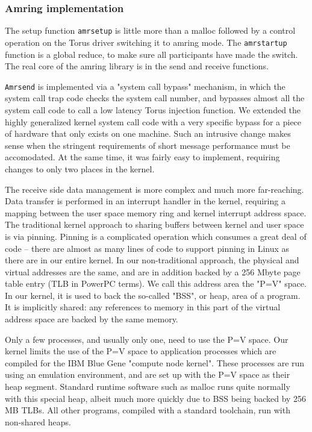\documentclass[letterpaper,twocolumn,10pt]{article}
\begin{document}
\subsubsection{Amring implementation}
The setup function {\tt amrsetup} is little more than a malloc followed by a 
control operation on the Torus driver switching it to amring mode. The {\tt amrstartup} 
function is a global reduce, to make sure all participants have made the switch. The real 
core of the amring library is in the send and receive functions. 

{\tt Amrsend} is implemented via a "system call bypass" mechanism, in which the system call trap code
checks the system call number, and bypasses almost all the system call code to call a low latency 
Torus injection function. We
extended the highly generalized kernel system call code with a very specific bypass for a piece of hardware that only exists on 
one machine. Such an intrusive change makes sense when the stringent requirements of short message 
performance must be accomodated. At the same time, it was fairly easy to implement, requiring changes to only two places in the kernel. 

The receive side data management is more complex and much more far-reaching. Data transfer is performed in an interrupt 
handler in the kernel, requiring a mapping between the user space memory ring and kernel interrupt address space. 
The traditional kernel approach to sharing buffers between kernel and user space is via pinning. Pinning is a complicated 
operation which consumes a great deal of code -- there are almost as many lines of code to support 
pinning in Linux as there are in our entire kernel. 
In our  non-traditional approach, the physical and virtual addresses are the same, and are in addition backed by a 
256 Mbyte page table entry (TLB in PowerPC terms). 
We call this address area the "P=V" space. In our kernel, it is used to back the so-called "BSS", or heap, area of a program. It is implicitly
shared: any references to memory in this part of the virtual address space are backed by the same memory. 

Only a few processes, and usually only one, need to use the P=V space. 
Our kernel limits the use of the P=V space to application processes which are compiled for the
IBM Blue Gene "compute node kernel". These
processes are run using an emulation environment\cite{plan9bgp}, and are set up with the P=V 
space as their heap segment. Standard runtime software such as malloc runs quite normally with this 
special heap, albeit much more quickly due to BSS being backed by 256 MB TLBs. All other programs,
compiled with a standard toolchain, run with non-shared heaps.
\end{document}
